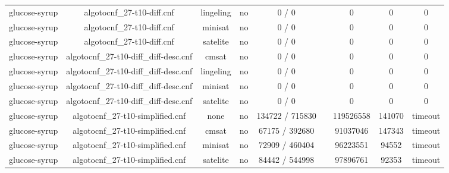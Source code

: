 \begin{appendices}
\begin{table}[p]
\begin{center}
\begin{tabular}{l|cccccccc}
  glucose-syrup                  & algotocnf\_27-t10-diff.cnf     & lingeling  & no    & 0 / 0      &           & 0         & 0          & 0 \\ %
  glucose-syrup                  & algotocnf\_27-t10-diff.cnf     & minisat    & no    & 0 / 0      &           & 0         & 0          & 0 \\ %
  glucose-syrup                  & algotocnf\_27-t10-diff.cnf     & satelite   & no    & 0 / 0      &           & 0         & 0          & 0 \\ %
  glucose-syrup                  & algotocnf\_27-t10-diff\_diff-desc.cnf & cmsat      & no    & 0 / 0      &           & 0         & 0          & 0 \\ %
  glucose-syrup                  & algotocnf\_27-t10-diff\_diff-desc.cnf & lingeling  & no    & 0 / 0      &           & 0         & 0          & 0 \\ %
  glucose-syrup                  & algotocnf\_27-t10-diff\_diff-desc.cnf & minisat    & no    & 0 / 0      &           & 0         & 0          & 0 \\ %
  glucose-syrup                  & algotocnf\_27-t10-diff\_diff-desc.cnf & satelite   & no    & 0 / 0      &           & 0         & 0          & 0 \\ %
  glucose-syrup                  & algotocnf\_27-t10-simplified.cnf & none       & no    & 134722 / 715830 &           & 119526558 & 141070     & timeout \\ %
  glucose-syrup                  & algotocnf\_27-t10-simplified.cnf & cmsat      & no    & 67175 / 392680 &           & 91037046  & 147343     & timeout \\ %
  glucose-syrup                  & algotocnf\_27-t10-simplified.cnf & minisat    & no    & 72909 / 460404 &           & 96223551  & 94552      & timeout \\ %
  glucose-syrup                  & algotocnf\_27-t10-simplified.cnf & satelite   & no    & 84442 / 544998 &           & 97896761  & 92353      & timeout \\ %

\end{tabular}
\end{center}
\end{table}
\end{appendices}
